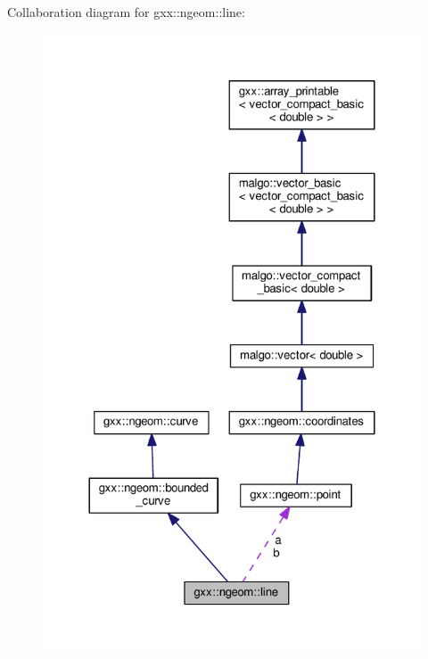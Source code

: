 Collaboration diagram for gxx\+:\+:ngeom\+:\+:line\+:
\nopagebreak
\begin{figure}[H]
\begin{center}
\leavevmode
\includegraphics[width=324pt]{classgxx_1_1ngeom_1_1line__coll__graph}
\end{center}
\end{figure}

